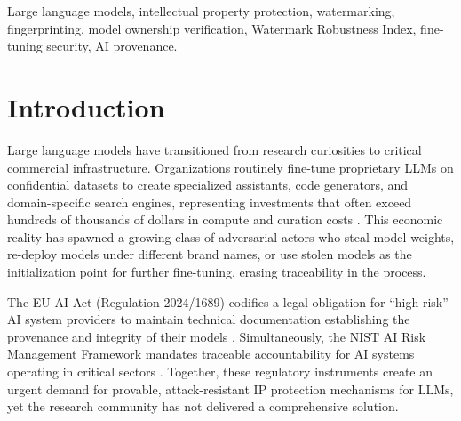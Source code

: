 \documentclass[journal,compsoc]{IEEEtran}
\begin{document}
{\begin{abstract}
Under aggressive re-fine-tuning (attack strength 0.6 or above), WRI degrades
to 0.46, indicating that current methods are not yet fully robust against
determined adversaries with unrestricted fine-tuning access.
GuardMark directly benefits LLM vendors, enterprise API providers, and legal
practitioners seeking algorithmic evidence for IP litigation within the
bounded threat regime ($\lambda \leq 0.50$); against fully unbounded
re-fine-tuning adversaries, ownership confirmation is not guaranteed.
More broadly, this work advances the emerging field of AI provenance and
establishes a rigorous, metric-driven evaluation protocol for future
watermarking research.
\end{abstract}

\begin{IEEEkeywords}
Large language models, intellectual property protection, watermarking,
fingerprinting, model ownership verification, Watermark Robustness Index,
fine-tuning security, AI provenance.
\end{IEEEkeywords}}

\maketitle

\section{Introduction}
\label{sec:intro}

Large language models have transitioned from research curiosities to critical
commercial infrastructure. Organizations routinely fine-tune proprietary LLMs
on confidential datasets to create specialized assistants, code generators, and
domain-specific search engines, representing investments that often exceed
hundreds of thousands of dollars in compute and curation costs
\cite{brown2020language,wei2022emergent,ouyang2022training}. This economic
reality has spawned a growing class of adversarial actors who steal model
weights, re-deploy models under different brand names, or use stolen models as
the initialization point for further fine-tuning, erasing traceability in the
process.

The EU AI Act (Regulation 2024/1689) codifies a legal obligation for
``high-risk'' AI system providers to maintain technical documentation
establishing the provenance and integrity of their models
\cite{eu2024aiact}. Simultaneously, the NIST AI Risk Management Framework
mandates traceable accountability for AI systems operating in critical sectors
\cite{nist2023ai}. Together, these regulatory instruments create an urgent
demand for provable, attack-resistant IP protection mechanisms for LLMs, yet
the research community has not delivered a comprehensive solution.
\end{document}
